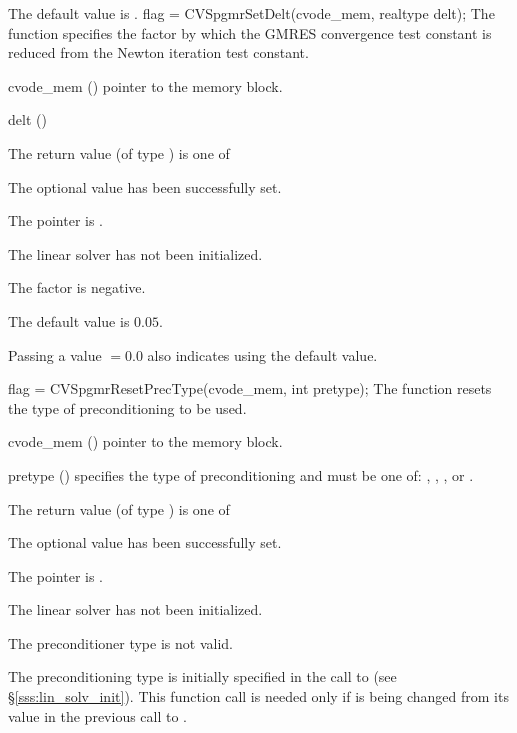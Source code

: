 {
  The default value is .
}
{
  flag = CVSpgmrSetDelt(cvode\_mem, realtype delt);
}
{
  The function  specifies the factor by
  which the GMRES convergence test constant is reduced
  from the Newton iteration test constant.
}
{
  \begin{args}
  \item[cvode\_mem] ()
    pointer to the {\cvode} memory block.
  \item[delt] ()

  \end{args}
}
{
  The return value  (of type ) is one of
  \begin{args}
  \item[\Id{CVSPGMR\_SUCCESS}] 
    The optional value has been successfully set.
  \item[\Id{CVSPGMR\_MEM\_NULL}]
    The  pointer is .
  \item[\Id{CVSPGMR\_LMEM\_NULL}]
    The {\cvspgmr} linear solver has not been initialized.
  \item[\Id{CVSPGMR\_ILL\_INPUT}]
    The factor  is negative.  
  \end{args}
}
{
  The default value is $0.05$.

  Passing a value $ = 0.0$ also indicates using the default value.
}
{
  flag = CVSpgmrResetPrecType(cvode\_mem, int pretype);
}
{
  The function  resets the type
  of preconditioning to be used.
}
{
  \begin{args}
  \item[cvode\_mem] ()
    pointer to the {\cvode} memory block.
  \item[pretype] ()
    specifies the type of preconditioning and must be one of:
    , , , or .
  \end{args}
}
{
  The return value  (of type ) is one of
  \begin{args}
  \item[\Id{CVSPGMR\_SUCCESS}] 
    The optional value has been successfully set.
  \item[\Id{CVSPGMR\_MEM\_NULL}]
    The  pointer is .
  \item[\Id{CVSPGMR\_LMEM\_NULL}]
    The {\cvspgmr} linear solver has not been initialized.
  \item[\Id{CVSPGMR\_ILL\_INPUT}]
    The preconditioner type  is not valid.
  \end{args}
}
{
  The preconditioning type is initially specified in the call
  to  (see \S\ref{sss:lin_solv_init}). This function call is
  needed only if  is being changed from its value in the
  previous call to .
}

